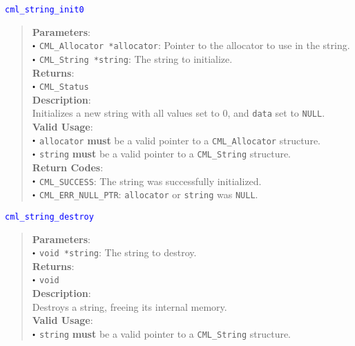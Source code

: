 \documentclass[a4paper,oneside,10pt]{article}
\newcommand{\function}[1]{
  \noindent\textcolor{blue}{\texttt{#1}}
  \vspace{-0.3em}
}
\renewcommand{\dot}{\raisebox{0.3ex}{\scalebox{0.6}{$\bullet$}}}
\theoremstyle{definition}
\begin{document}
\function{cml\_string\_init0}
\begin{quote}
  \textbf{Parameters}: \\
  $\dot$ \texttt{CML\_Allocator *allocator}: Pointer to the allocator to use in the string. \\
  $\dot$ \texttt{CML\_String *string}: The string to initialize. \\
  \textbf{Returns}: \\
  $\dot$ \texttt{CML\_Status} \\
  
  \vspace{-0.75em}
  \textbf{Description}: \\
  Initializes a new string with all values set to 0, and \texttt{data} set to \texttt{NULL}. \\

  \vspace{-0.75em}
  \textbf{Valid Usage}: \\
  $\dot$ \texttt{allocator} \textbf{must} be a valid pointer to a \texttt{CML\_Allocator} structure. \\
  $\dot$ \texttt{string} \textbf{must} be a valid pointer to a \texttt{CML\_String} structure. \\

  \vspace{-0.75em}
  \textbf{Return Codes}: \\
  $\dot$ \texttt{CML\_SUCCESS}: The string was successfully initialized. \\
  $\dot$ \texttt{CML\_ERR\_NULL\_PTR}: \texttt{allocator} or \texttt{string} was \texttt{NULL}. \\
\end{quote}

\function{cml\_string\_destroy}
\begin{quote}
  \textbf{Parameters}: \\
  $\dot$ \texttt{void *string}: The string to destroy. \\
  \textbf{Returns}: \\
  $\dot$ \texttt{void} \\
  
  \vspace{-0.75em}
  \textbf{Description}: \\
  Destroys a string, freeing its internal memory. \\

  \vspace{-0.75em}
  \textbf{Valid Usage}: \\
  $\dot$ \texttt{string} \textbf{must} be a valid pointer to a \texttt{CML\_String} structure. \\
\end{quote}
\end{document}
